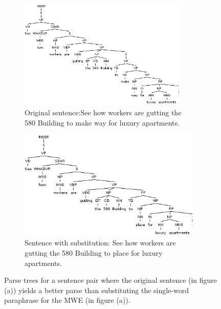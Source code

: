 \documentclass[11pt]{article}
\begin{document}
\begin{figure}
\centering
\begin{subfigure}{.5\textwidth}
  \centering
  \includegraphics[width=80mm]{figs/make_way_tree.png}
  \caption{Original sentence:See how workers are gutting the \\
 580 Building to make way for luxury apartments.}
  \label{fig:sub1}
\end{subfigure}%
\begin{subfigure}{.5\textwidth}
  \centering
  \includegraphics[width=87mm]{figs/place_tree.png}
  \caption{Sentence with substitution: See how workers are gutting the 580 Building to place for luxury apartments.}
  \label{fig:sub2}
\end{subfigure}
\caption{Parse trees for a sentence pair where the original sentence (in figure (a)) yields a better parse than substituting the single-word paraphrase for the MWE (in figure (a)).}
\label{place}
\end{figure}

%
%
% 
% 
\end{document}
